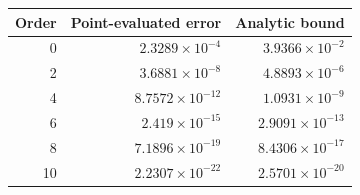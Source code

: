 \begin{tabular}{rrr}\toprule Order & Point-evaluated error & Analytic bound\\\midrule
0 & $2.3289\times10^{-4}$ & $3.9366\times10^{-2}$\\
2 & $3.6881\times10^{-8}$ & $4.8893\times10^{-6}$\\
4 & $8.7572\times10^{-12}$ & $1.0931\times10^{-9}$\\
6 & $2.419\times10^{-15}$ & $2.9091\times10^{-13}$\\
8 & $7.1896\times10^{-19}$ & $8.4306\times10^{-17}$\\
10 & $2.2307\times10^{-22}$ & $2.5701\times10^{-20}$\\
\bottomrule\end{tabular}
